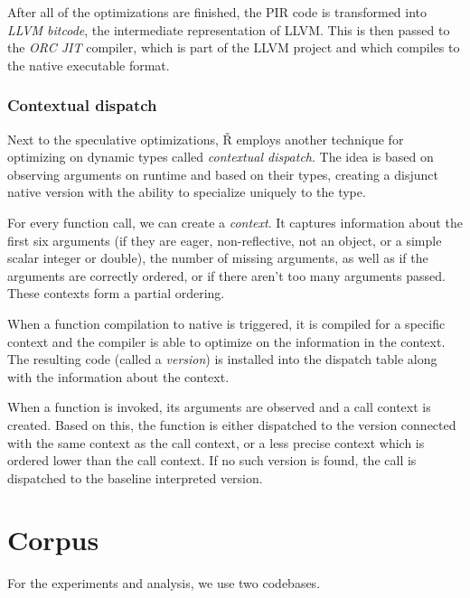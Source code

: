 After all of the optimizations are finished, the PIR code is transformed into \textit{LLVM bitcode}, the intermediate representation of LLVM. This is then passed to the \textit{ORC JIT} compiler, which is part of the LLVM project and which compiles to the native executable format.

\subsubsection*{Contextual dispatch}\label{ch:1-ctx-dispatch}

Next to the speculative optimizations, Ř employs another technique for optimizing on dynamic types called \textit{contextual dispatch}\cite{ctx-dispatch}. The idea is based on observing arguments on runtime and based on their types, creating a disjunct native version with the ability to specialize uniquely to the type.

For every function call, we can create a \textit{context}. It captures information about the first six arguments (if they are eager, non-reflective, not an object, or a simple scalar integer or double), the number of missing arguments, as well as if the arguments are correctly ordered, or if there aren’t too many arguments passed. These contexts form a partial ordering.

When a function compilation to native is triggered, it is compiled for a specific context and the compiler is able to optimize on the information in the context. The resulting code (called a \textit{version}) is installed into the dispatch table along with the information about the context.

When a function is invoked, its arguments are observed and a call context is created. Based on this, the function is either dispatched to the version connected with the same context as the call context, or a less precise context which is ordered lower than the call context. If no such version is found, the call is dispatched to the baseline interpreted version.

\section{Corpus}\label{ch:1-corpus}

For the experiments and analysis, we use two codebases.


